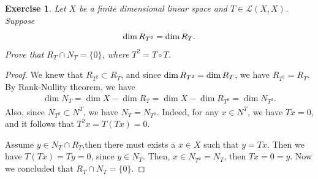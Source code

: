 \documentclass[11pt]{book}
\newtheorem{exercise}{Exercise}[section]
\theoremstyle{definition}
\numberwithin{equation}{chapter}
\begin{document}
\medskip

\begin{exercise}
Let $X$ be a finite dimensional linear space and $T\in\mathscr{L}(X,X)$. Suppose $${\rm dim}\, R_{T^2} = {\rm dim}\, R_T.$$
Prove that $R_T\cap N_T = \{0\}$, where $T^2 = T\circ T$.
\end{exercise}
\begin{proof}
We knew that $R_{T^2}\subset R_T$, and since ${\rm dim}\, R_{T^2} = {\rm dim}\, R_T$, we have $R_{T^2} = R_T$. By Rank-Nullity theorem, we have
\begin{align*}
    \dim N_T = \dim X - \dim R_T = \dim X - \dim R_{T^2} = \dim N_{T^2}.
\end{align*}
Also, since $N_{T^2} \subset N^T$, we have $N_T = N_{T^2}$. Indeed, for any $x \in N^T$, we have $Tx = 0$, and it follows that $T^2x = T(Tx) = 0$. 

Assume $y\in N_T\cap R_T$,then there must exists a $x\in X$ such that $y = T x$. Then we have $T(Tx) = Ty = 0$, since $y\in N_T$. Then, $x\in N_{T^2} = N_T$, then $Tx = 0 = y$. Now we concluded that $R_T\cap N_T = \{0\}$.
\end{proof}

\medskip
\end{document}
